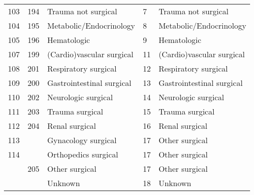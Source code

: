 \documentclass{article}
\begin{document}
\begin{table}[ht!]
{\begin{tabular}{lllll}
103                        & 194                        & Trauma not surgical                                     & 7                     & Trauma not surgical                                     \\
104                        & 195                        & Metabolic/Endocrinology                                 & 8                     & Metabolic/Endocrinology                                 \\
105                        & 196                        & Hematologic                                             & 9                     & Hematologic                                             \\
107                        & 199                        & {\color[HTML]{333333} (Cardio)vascular surgical} & 11                    & {\color[HTML]{333333} (Cardio)vascular surgical} \\
108                        & 201                        & Respiratory surgical                                    & 12                    & Respiratory surgical                                    \\
109                        & 200                        & Gastrointestinal surgical                               & 13                    & Gastrointestinal surgical                               \\
110                        & 202                        & Neurologic surgical                                     & 14                    & Neurologic surgical                                     \\
111                        & 203                        & Trauma surgical                                         & 15                    & Trauma surgical                                         \\
112                        & 204                        & Renal surgical                                          & 16                    & Renal surgical                                          \\
113                        &                            & Gynacology surgical                                     & 17                    & Other surgical                                          \\
114                        &                            & Orthopedics surgical                                    & 17                    & Other surgical                                          \\
                           & 205                        & Other surgical                                          & 17                    & Other surgical                                          \\
                           &                            & Unknown                                                 & 18                    & Unknown     \\                                           
\bottomrule
\end{tabular}
}
\end{table}
\FloatBarrier
\end{document}
